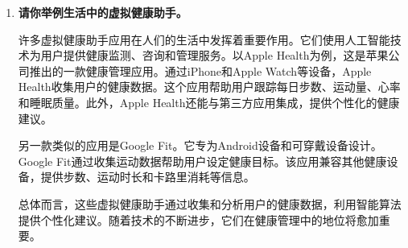 \begin{enumerate}
\item \textbf{请你举例生活中的虚拟健康助手。}




许多虚拟健康助手应用在人们的生活中发挥着重要作用。它们使用人工智能技术为用户提供健康监测、咨询和管理服务。以Apple Health为例，这是苹果公司推出的一款健康管理应用。通过iPhone和Apple Watch等设备，Apple Health收集用户的健康数据。这个应用帮助用户跟踪每日步数、运动量、心率和睡眠质量。此外，Apple Health还能与第三方应用集成，提供个性化的健康建议。

另一款类似的应用是Google Fit。它专为Android设备和可穿戴设备设计。Google Fit通过收集运动数据帮助用户设定健康目标。该应用兼容其他健康设备，提供步数、运动时长和卡路里消耗等信息。

总体而言，这些虚拟健康助手通过收集和分析用户的健康数据，利用智能算法提供个性化建议。随着技术的不断进步，它们在健康管理中的地位将愈加重要。

\end{enumerate}